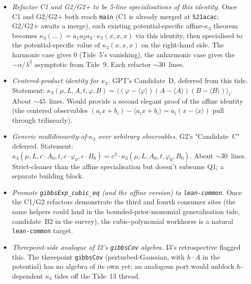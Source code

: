 \documentclass[11pt]{article}
\begin{document}
\begin{itemize}[leftmargin=1em,itemsep=0.2em]
\item \emph{Refactor C1 and G2/G2+ to be 5-line specialisations of
  this identity.} Once C1 and G2/G2+ both reach \texttt{main} (C1 is
  already merged at \texttt{521acac}; G2/G2+ awaits a merge), each
  existing potential-specific affine-$\kappa_3$ theorem becomes
  $\kappa_3(\ldots) = a_1 a_2 a_3 \cdot \kappa_3(x,x,x)$ via this
  identity, then specialised to the potential-specific value of
  $\kappa_3(x,x,x)$ on the right-hand side. The harmonic case gives
  $0$ (Tide~5's vanishing), the anharmonic case gives the
  $-\alpha/\lambda^3$ asymptotic from Tide~9. Each refactor
  $\sim 30$~lines.

\item \emph{Centered-product identity for $\kappa_3$.} GPT's
  Candidate~D, deferred from this tide. Statement:
  $\kappa_3(\mu, L, A, t, \varphi, B) = \langle (\varphi - \langle
  \varphi \rangle)(A - \langle A \rangle)(B - \langle B \rangle)
  \rangle_t$. About $\sim 45$~lines. Would provide a second elegant
  proof of the affine identity (the centered observables
  $(a_i x + b_i) - \langle a_i x + b_i \rangle = a_i(x - \langle x
  \rangle)$ pull through trilinearly).

\item \emph{Generic multilinearity-of-$\kappa_3$ over arbitrary
  observables.} G2's "Candidate~C" deferred. Statement:
  $\kappa_3(\mu, L, c \cdot A_0, t, c \cdot \varphi_0, c \cdot B_0)
  = c^3 \cdot \kappa_3(\mu, L, A_0, t, \varphi_0, B_0)$. About
  $\sim 30$~lines. Strict-cleaner than the affine specialisation
  but doesn't subsume Q1; a separate building block.

\item \emph{Promote \texttt{gibbsExp\_cubic\_eq} (and the affine
  version) to \texttt{lean-common}.} Once the C1/G2 refactors
  demonstrate the third and fourth consumer sites (the same helpers
  could land in the bounded-prior-monomial generalisation tide,
  candidate~B2 in the survey), the cubic-polynomial workhorse is a
  natural \texttt{lean-common} target.

\item \emph{Threepoint-side analogue of I2's \texttt{gibbsCov}
  algebra.} I3's retrospective flagged this. The threepoint
  \texttt{gibbsCov} (perturbed-Gaussian, with $h \cdot A$ in the
  potential) has no algebra of its own yet; an analogous port would
  unblock $h$-dependent $\kappa_3$ tides off the Tide~13 thread.


\end{itemize}
\end{document}
